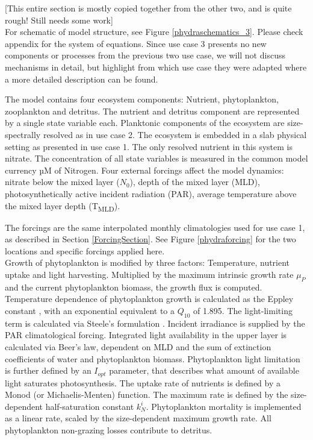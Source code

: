 \documentclass[template.tex]{subfiles}
\begin{document}
[This entire section is mostly copied together from the other two, and is quite rough! Still needs some work]\\

For schematic of model structure, see Figure \ref{phydraschematics_3}. Please check appendix for the system of equations. 
Since use case 3 presents no new components or processes from the previous two use case, we will not discuss mechanisms in detail, but highlight from which use case they were adapted where a more detailed description can be found. 

The model contains four ecosystem components: Nutrient, phytoplankton, zooplankton and detritus. The nutrient and detritus component are represented by a single state variable each. Planktonic components of the ecosystem are size-spectrally resolved as in use case 2.
The ecosystem is embedded in a slab physical setting as presented in use case 1. The only resolved nutrient in this system is nitrate. The concentration of all state variables is measured in the common model currency \unit{µM} of Nitrogen. Four external forcings affect the model dynamics: nitrate below the mixed layer ($N_0$), depth of the mixed layer (MLD), photosynthetically active incident radiation (PAR), average temperature above the mixed layer depth (\unit{T_{MLD}}). 

The forcings are the same interpolated monthly climatologies used for use case 1, as described in Section \ref{ForcingSection}. See Figure \ref{phydraforcing} for the two locations and specific forcings applied here.\\

Growth of phytoplankton is modified by three factors: Temperature, nutrient uptake and light harvesting. Multiplied by the maximum intrinsic growth rate $\mu_P$ and the current phytoplankton biomass, the growth flux is computed. Temperature dependence of phytoplankton growth is calculated as the Eppley constant \citep{Eppley1972TemperatureSea}, with an exponential equivalent to a $Q_{10}$ of 1.895.
The light-limiting term is calculated via Steele's formulation \citep{Steele1962EnvironmentalSea}. Incident irradiance is supplied by the PAR climatological forcing. Integrated light availability in the upper layer is calculated via Beer's law, dependent on MLD and the sum of extinction coefficients of water and phytoplankton biomass. Phytoplankton light limitation is further defined by an $I_{opt}$ parameter, that describes what amount of available light saturates photosynthesis.
The uptake rate of nutrients is defined by a Monod (or Michaelis-Menten) function. The maximum rate is defined by the size-dependent half-saturation constant $k^i_N$. 
Phytoplankton mortality is implemented as a linear rate, scaled by the size-dependent maximum growth rate. 
All phytoplankton non-grazing losses contribute to detritus.\\
\end{document}
